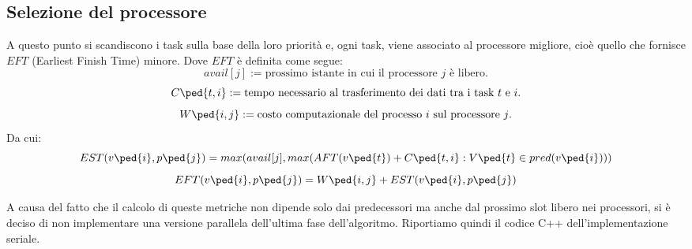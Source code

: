 \subsection{Selezione del processore}
A questo punto si scandiscono i task sulla base della loro priorità e, ogni task, viene associato al processore migliore, cioè quello che fornisce $EFT$ (Earliest Finish Time) minore. 
Dove $EFT$ è definita come segue:
\begin{displaymath}
	avail[j] := \text{prossimo istante in cui il processore $j$ è libero.}
\end{displaymath}
\begin{displaymath}
	C\ped{t,i} := \text{tempo necessario al trasferimento dei dati tra i task $t$ e $i$.} 
\end{displaymath}
\begin{displaymath}
	W\ped{i,j} := \text{costo computazionale del processo $i$ sul processore $j$.} 
\end{displaymath}
Da cui:
\begin{equation}\label{EST}
	EST(v\ped{i},p\ped{j}) = max(avail[j], max(AFT(v\ped{t}) + C\ped{t,i} : V\ped{t} \in pred(v\ped{i})))
\end{equation}
\begin{equation}\label{EFT}
	EFT(v\ped{i},p\ped{j}) = W\ped{i,j} + EST(v\ped{i},p\ped{j})
\end{equation}

A causa del fatto che il calcolo di queste metriche non dipende solo dai predecessori ma anche dal prossimo slot libero nei processori, si è deciso di non implementare una versione parallela dell'ultima fase dell'algoritmo. Riportiamo quindi il codice C++ dell'implementazione seriale.\\

\newpage

